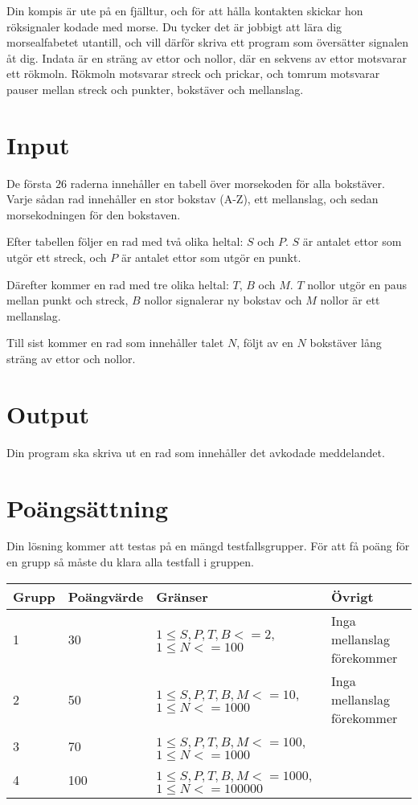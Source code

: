 
Din kompis är ute på en fjälltur, och för att hålla kontakten skickar hon röksignaler kodade med morse. Du tycker det är jobbigt att lära dig morsealfabetet utantill, och vill därför skriva ett program som översätter signalen åt dig. Indata är en sträng av ettor och nollor, där en sekvens av ettor motsvarar ett rökmoln. Rökmoln motsvarar streck och prickar, och tomrum motsvarar pauser mellan streck och punkter, bokstäver och mellanslag.

\section*{Input}
De första $26$ raderna innehåller en tabell över morsekoden för alla bokstäver.
Varje sådan rad innehåller en stor bokstav (A-Z), ett mellanslag, och sedan morsekodningen för den bokstaven.

Efter tabellen följer en rad med två olika heltal: $S$ och $P$.
$S$ är antalet ettor som utgör ett streck, och $P$ är antalet ettor som utgör en punkt.

Därefter kommer en rad med tre olika heltal: $T$, $B$ och $M$.
$T$ nollor utgör en paus mellan punkt och streck, $B$ nollor signalerar ny bokstav och $M$ nollor är ett mellanslag.

Till sist kommer en rad som innehåller talet $N$, följt av en $N$ bokstäver lång sträng av ettor och nollor.

\section*{Output}
Din program ska skriva ut en rad som innehåller det avkodade meddelandet.

\section*{Poängsättning}
Din lösning kommer att testas på en mängd testfallsgrupper. För att få poäng för en grupp
så måste du klara alla testfall i gruppen.
\begin{tabular}{| l | l | l | l |}
\hline
Grupp & Poängvärde & Gränser & Övrigt \\ \hline
1     & 30         &  $1 \le S, P, T, B <= 2$, $1 \le N <= 100$  & Inga mellanslag förekommer\\ \hline
2     & 50         &  $1 \le S, P, T, B, M <= 10$, $1 \le N <= 1000$ & Inga mellanslag förekommer \\ \hline
3     & 70         &  $1 \le S, P, T, B, M <= 100$, $1 \le N <= 1000$    & \\ \hline
4     & 100        &  $1 \le S, P, T, B, M <= 1000$, $1 \le N <= 100000$  & \\ \hline
\end{tabular}
